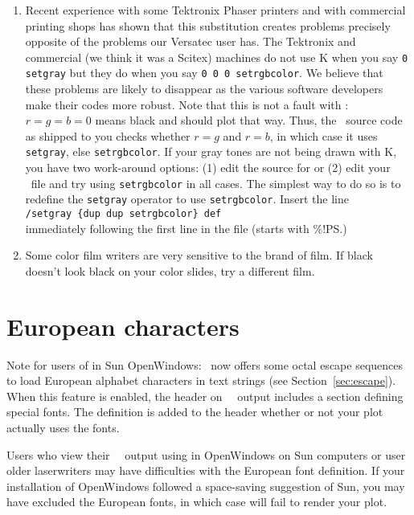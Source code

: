 \begin{enumerate}
\item Recent experience with some Tektronix Phaser printers and
with commercial printing shops has shown that this substitution
creates problems precisely opposite of the problems our Versatec
user has.  The Tektronix and commercial (we think it was a Scitex)
machines do not use K when you say \texttt{0 setgray} but they do when
you say \texttt{0 0 0 setrgbcolor}.  We believe that these problems are
likely to disappear as the various software developers make their
codes more robust.  Note that this is not a fault with \GMT:
$r = g = b = 0$ means black and should plot that way.
Thus, the \GMT\ source code as shipped to you checks whether $r=g$
and $r=b$, in which case it uses \texttt{setgray}, else \texttt{setrgbcolor}.
If your gray tones are not being drawn with K, you have two
work-around options: (1) edit the source for 
or (2) edit your \PS\ file and try using \texttt{setrgbcolor}
in all cases.  The simplest way to do so is to redefine the
\texttt{setgray} operator to use \texttt{setrgbcolor}.
Insert the line \\

\indent \texttt{/setgray  \{dup dup setrgbcolor\} def} \\

immediately following the first line in the file (starts with
\%!PS.) 

\item Some color film writers are very sensitive to the brand
of film.  If black doesn't look black on your color slides, try
a different film.

\end{enumerate}

\section{European characters}
Note for users of  in Sun OpenWindows: \GMT\ now
offers some octal escape sequences to load European alphabet
characters in text strings (see Section~\ref{sec:escape}).  When
this feature is enabled, the header on \GMT\ \PS\ output includes
a section defining special fonts.  The definition is added to
the header whether or not your plot actually uses the fonts.

Users who view their \GMT\ \PS\ output using
 in OpenWindows on Sun computers or user older
laserwriters may have difficulties with the European font
definition.  If your installation of OpenWindows followed
a space-saving suggestion of Sun, you may have excluded the
European fonts, in which case  will fail
to render your plot.

